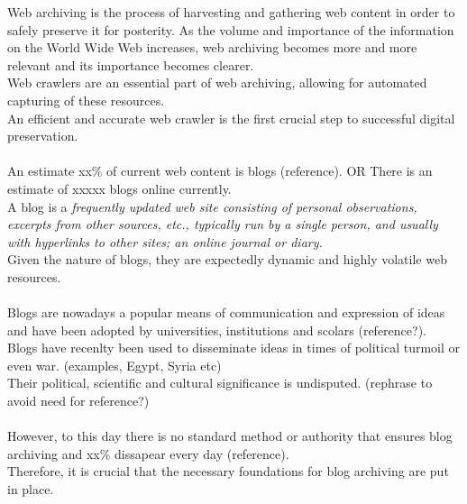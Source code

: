 Web archiving is the process of harvesting and gathering web content in order to safely preserve it for posterity.
As the volume and importance of the information on the World Wide Web increases, web archiving becomes more and more relevant and its importance becomes clearer.\\
Web crawlers are an essential part of web archiving, allowing for automated capturing of these resources.\\
An efficient and accurate web crawler is the first crucial step to successful digital preservation.\\
\\
An estimate xx\% of current web content is blogs (reference). OR There is an estimate of xxxxx blogs online currently.\\
A blog is a \emph{frequently updated web site consisting of personal observations, excerpts from other sources, etc., typically run by a single person, and usually with hyperlinks to other sites; an online journal or diary.}\\
Given the nature of blogs, they are expectedly dynamic and highly volatile web resources.\\
\\
Blogs are nowadays a popular means of communication and expression of ideas and have been adopted by universities, institutions and scolars (reference?).\\
Blogs have recenlty been used to disseminate ideas in times of political turmoil or even war. (examples, Egypt, Syria etc)\\
Their political, scientific and cultural significance is undisputed. (rephrase to avoid need for reference?)\\
\\
However, to this day there is no standard method or authority that ensures blog archiving and xx\% dissapear every day (reference).\\
Therefore, it is crucial that the necessary foundations for blog archiving are put in place.\\
\\
